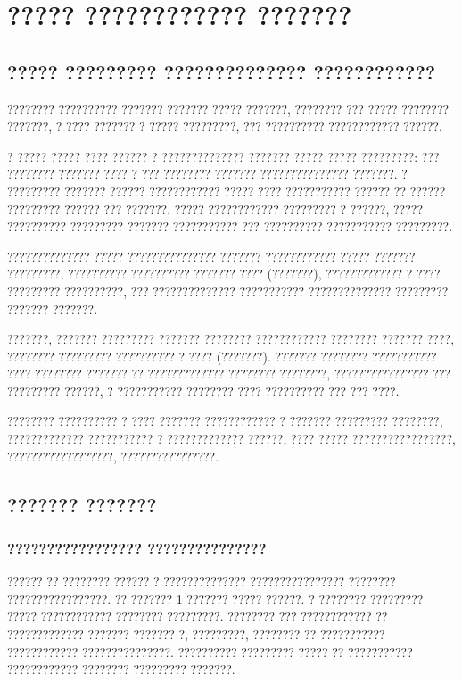 	\section {????? ???????????? ???????}	
	\subsection {????? ????????? ?????????????? ????????????}
	???????? ?????????? ??????? ??????? ????? ???????, ???????? ??? ????? ???????? ???????, ? ???? ??????? ? ????? ?????????, ??? ?????????? ???????????? ??????.\cite{vasilenko} 
	
	? ????? ????? ???? ?????? ? ?????????????? ??????? ????? ????? ?????????: ??? ???????? ??????? ???? ? ??? ???????? ??????? ??????????????? ???????.
	? ?????????	??????? ?????? ???????????? ????? ???? ??????????? ?????? ??
	?????? ????????? ?????? ??? ???????. ????? ???????????? ????????? ? ??????, ????? ?????????? ????????? ??????? ??????????? ??? ?????????? ??????????? ?????????.
	
	?????????????? ????? ??????????????? ??????? ???????????? ????? ??????? ?????????, ?????????? ?????????? ??????? ???? (???????), ????????????? ? ???? ????????? ??????????, ???	?????????????? ??????????? ?????????????? ????????? ??????? ???????.
	
	???????, ??????? ????????? ??????? ???????? ????????????
	???????? ??????? ????, ???????? ????????? ?????????? ? ????
	(???????). ??????? ???????? ??????????? ???? ???????? ???????
	?? ????????????? ???????? ????????, ???????????????? ???
	????????? ??????, ? ??????????? ???????? ???? ?????????? ???
	??? ????\cite{yurevich}\cite{troch}.
	
	???????? ?????????? ? ???? ??????? ???????????? ? ???????
	????????? ????????, ????????????? ??????????? ? ????????????? ??????, ???? ????? ?????????????????, ??????????????????, ????????????????.
	\subsection {??????? ???????}
	
	\subsubsection{????????????????? ???????????????}
	
	?????? ?? ???????? ?????? ? ?????????????? ???????????????? ????????  ?????????????????\cite{presnuhin}. ?? ??????? 1 ???????	????? ??????. ? ???????? ????????? ????? ???????????? ???????? ?????????. ???????? ??? ???????????? ?? ????????????? ???????
	??????? ?, ?????????, ???????? ?? ??????????? ????????????
	???????????????. ?????????? ????????? ????? ?? ??????????? ???????????? ???????? ????????? ???????.
	
